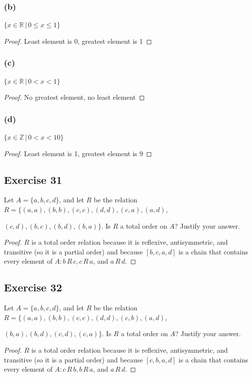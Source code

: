 \documentclass[14pt]{extarticle}
\newcommand{\R}{\mathbb{R}}
\newcommand{\Z}{\mathbb{Z}}
\begin{document}
\subsubsection{(b)}
\(\{x \in \R \,|\, 0 \leq x \leq 1\}\)
\begin{proof}
Least element is 0, greatest element is 1
\end{proof}

\subsubsection{(c)}
\(\{x \in \R \,|\, 0 < x < 1\}\)
\begin{proof}
No greatest element, no least element
\end{proof}

\subsubsection{(d)}
\(\{x \in \Z \,|\, 0 < x < 10\}\)
\begin{proof}
Least element is 1, greatest element is 9
\end{proof}

\subsection{Exercise 31}
Let \(A = \{a, b, c, d\}\), and let \(R\) be the relation \(R = \{(a, a), (b, b), (c, c), (d, d), (c, a), (a, d)\),

\((c, d), (b, c), (b, d), (b, a)\}\). Is \(R\) a total order on \(A\)? Justify your answer.

\begin{proof}
$R$ is a total order relation because it is reflexive, antisymmetric, and transitive (so it is a partial order) 
and because \([b, c, a, d]\) is a chain that contains every element of \(A: b \,R\, c, c \,R\, a\), and \(a \,R\, d\).
\end{proof}

\subsection{Exercise 32}
Let \(A = \{a, b, c, d\}\), and let \(R\) be the relation \(R = \{(a, a), (b, b), (c, c), (d, d), (c, b), (a, d)\), 

\((b, a), (b, d), (c, d), (c, a)\}\). Is \(R\) a total order on \(A\)? Justify your answer.

\begin{proof}
$R$ is a total order relation because it is reflexive, antisymmetric, and transitive (so it is a partial order) 
and because \([c, b, a, d]\) is a chain that contains every element of \(A: c \,R\, b, b \,R\, a\), and \(a \,R\, d\).
\end{proof}
\end{document}
